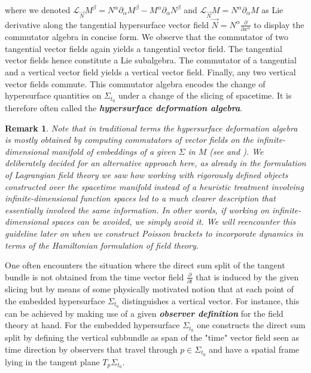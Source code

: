 \documentclass[a4paper,12pt, DIV=14, BCOR=5mm, twoside, headsepline, numbers=noenddot]{scrbook}
\newtheorem*{remark}{Remark}
\begin{document}
where we denoted $\mathcal{L}_{\Vec{N}}M^{\beta} = N^\alpha \partial_{\alpha}M^{\beta} - M^{\alpha} \partial_{\alpha} N^{\beta}$ and $\mathcal{L}_{\Vec{N}}M = N^{\alpha} \partial_{\alpha} M$ as Lie derivative along the tangential hypersurface vector field $\vec{N} = N^{\alpha} \frac{\partial}{\partial x^{\alpha}}$ to display the commutator algebra in concise form.
We observe that the commutator of two tangential vector fields again yields a tangential vector field. The tangential vector fields hence constitute a Lie subalgebra. 
The commutator of a tangential and a vertical vector field yields a vertical vector field.
Finally, any two vertical vector fields commute. This commutator algebra encodes the change of hypersurface quantities on $\Sigma_{t_0}$ under a change of the slicing of spacetime. It is therefore often called the \textit{\textbf{hypersurface deformation algebra}}.

\begin{remark}
Note that in traditional terms the hypersurface deformation algebra is mostly obtained by computing commutators of vector fields on the infinite-dimensional manifold of embeddings of a given $\Sigma$ in $M$ (see \cite{HOJMAN197688} and \cite{doi:10.1063/1.522976}). We deliberately decided for an alternative approach here, as already in the formulation of Lagrangian field theory we saw how working with rigorously defined objects constructed over the spacetime manifold instead of a heuristic treatment involving infinite-dimensional function spaces led to a much clearer description that essentially involved the same information. In other words, if working on infinite-dimensional spaces can be avoided, we simply avoid it. We will reencounter this guideline later on when we construct Poisson brackets to incorporate dynamics in terms of the Hamiltonian formulation of field theory.
\end{remark}

One often encounters the situation where the direct sum split of the tangent bundle is not obtained from the time vector field $\frac{\partial}{\partial t}$ that is induced by the given slicing but by means of some physically motivated notion that at each point of the embedded hypersurface $\Sigma_{t_0}$ distinguishes a vertical vector. For instance, this can be achieved by making use of a given \textit{\textbf{observer definition}} for the field theory at hand. For the embedded hypersurface $\Sigma_{t_0}$ one constructs the direct sum split by defining the vertical subbundle as span of the "time" vector field seen as time direction by observers that travel through $p \in \Sigma_{t_0}$ and have a spatial frame lying in the tangent plane $T_p\Sigma_{t_0}$.
\end{document}
